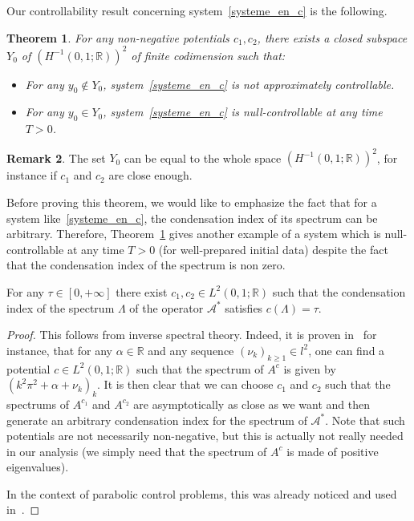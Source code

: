 \documentclass[10pt]{amsart}
\newtheorem{theo}{Theorem}[section]
\theoremstyle{definition}\newtheorem{defi}[theo]{Definition}\newtheorem{rema}[theo]{Remark}\newtheorem{exam}[theo]{Example}\newtheorem{exem}[theo]{Example}\newtheorem{nota}[theo]{Notation}
\newcommand\As{\mathcal{A}^*}
\newcommand{\Fzp}{Y_0}
\newcommand{\R}{\mathbb{R}}
\begin{document}
Our controllability result concerning system~\eqref{systeme_en_c} is the following.
\begin{theo}\label{theorem_systeme_en_c}
For any non-negative potentials $c_1,c_2$, there exists a closed subspace $\Fzp$ of $(H^{-1}(0,1 ; \R))^2$ of finite codimension such that:
\begin{itemize}
\item For any $y_0\not\in \Fzp$, system~\eqref{systeme_en_c} is not approximately controllable.
\item For any $y_0\in \Fzp$, system~\eqref{systeme_en_c} is null-controllable at any time $T>0$.
\end{itemize}
\end{theo}

\begin{rema}
The set $\Fzp$ can be equal to the whole space $(H^{-1}(0,1 ; \R))^2$, for instance if $c_1$ and $c_2$ are close enough.
\end{rema}

Before proving this theorem, we would like to emphasize the fact that for a system like~\eqref{systeme_en_c}, the condensation index of its spectrum can be arbitrary. Therefore, Theorem~\ref{theorem_systeme_en_c} gives another example of a system which is null-controllable at any time $T>0$ (for well-prepared initial data) despite the fact that the condensation index of the spectrum is non zero.

\begin{prop}
For any $\tau\in [0,+\infty]$ there exist $c_1,c_2\in L^2(0,1;\R)$ such that the condensation index of the spectrum $\Lambda$ of the operator $\As$ satisfies $c(\Lambda)=\tau$.
\end{prop}

\begin{proof}
This follows from inverse spectral theory. Indeed, it is proven in~\cite[Chapter~3]{PoeschelTrubowitz:1987} for instance, that for any $\alpha\in \R$ and any sequence $(\nu_k)_{k\geq 1}\in l^2$, one can find a potential $c\in L^2(0,1;\R)$ such that the spectrum of $A^c$ is given by $(k^2\pi^2 + \alpha + \nu_k)_k$. It is then clear that we can choose $c_1$ and $c_2$ such that the spectrums of $A^{c_1}$ and $A^{c_2}$ are asymptotically as close as we want and then generate an arbitrary condensation index for the spectrum of $\As$. Note that such potentials are not necessarily non-negative, but this is actually not really needed in our analysis (we simply need that the spectrum of $A^c$ is made of positive eigenvalues).

In the context of parabolic control problems, this was already noticed and used in~\cite{Ouaili18}.
\end{proof}
\end{document}
